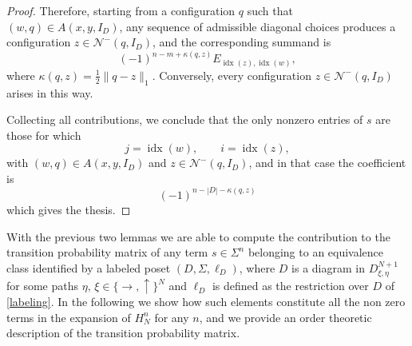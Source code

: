 \documentclass{article}
\begin{document}
\begin{proof}
Therefore, starting from a configuration \(q\) such that \((w,q)\in A(x,y,I_D)\), any sequence of admissible diagonal choices produces a configuration \(z\in\mathcal{N}^-(q,I_D)\), and the corresponding summand is
\[
(-1)^{n-m+\kappa(q,z)}E_{\operatorname{idx}(z),\operatorname{idx}(w)},
\]
where \(\kappa(q,z)=\frac12\|q-z\|_1\). Conversely, every configuration \(z\in\mathcal{N}^-(q,I_D)\) arises in this way.

Collecting all contributions, we conclude that the only nonzero entries of \(s\) are those for which
\[
j=\operatorname{idx}(w),\qquad i=\operatorname{idx}(z),
\]
with \((w,q)\in A(x,y,I_D)\) and \(z\in\mathcal{N}^-(q,I_D)\), and in that case the coefficient is
\[
(-1)^{n-|D|-\kappa(q,z)}
\]
which gives the thesis.

\end{proof}
With the previous two lemmas we are able to compute the contribution to the transition probability matrix of any term $s\in\Sigma^n$ belonging to an equivalence class identified by a labeled poset $(D,\Sigma,\ell_D)$, where $D$ is a diagram in $D^{N+1}_{\xi,\eta}$ for some paths $\eta,\,\xi\in\{\rightarrow,\uparrow\}^N$ and $\ell_D$ is defined as the restriction over $D$ of \eqref{labeling}. In the following we show how such elements constitute all the non zero terms in the expansion of $H_N^n$ for any $n$, and we provide an order theoretic description of the transition probability matrix. 
\end{document}
